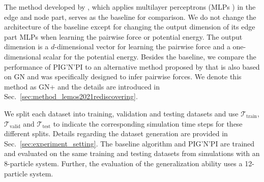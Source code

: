 \documentclass{article}
\newcommand{\pignpi}{PIG'N'PI\xspace}
\newcommand{\lemos}{GN+\xspace}
\begin{document}
The method developed by \cite{cranmer2020discovering}, which applies multilayer perceptrons (MLPs \cite{goodfellow2016deep}) in the edge and node part, serves as the baseline for comparison. We do not change the architecture of the baseline except for changing the output dimension of its edge part MLPs when learning the pairwise force or potential energy. 
The output dimension is a $d$-dimensional vector for learning the pairwise force and a one-dimensional scalar for the potential energy.
{Besides the baseline, we compare the performance of \pignpi to an alternative method proposed by \cite{lemos2021rediscovering} that is also based on GN and was specifically designed to infer pairwise forces. We denote this method as \lemos and the details are introduced in Sec.~\ref{sec:method_lemos2021rediscovering}}.


We split each dataset into training, validation and testing datasets and use  $\mathcal{T}_{\text{train}}$, $\mathcal{T}_{\text{valid}}$ and $\mathcal{T}_{\text{test}}$ to indicate the corresponding simulation time steps for these different splits. Details regarding the dataset generation are provided in Sec.~\ref{sec:experiment_setting}. The baseline algorithm and \pignpi are trained and evaluated on the same training and testing datasets from simulations with an 8-particle system. Further, the evaluation of the generalization ability uses a 12-particle system. 
\end{document}
